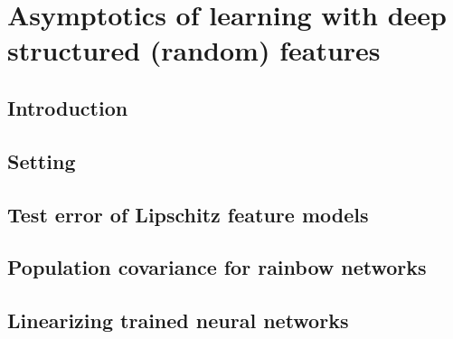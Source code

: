 \chapter[Deep random features]{Asymptotics of learning with deep structured (random) features}
\label{chap:deeprf}
\section{Introduction}

\section{Setting}

\section{Test error of Lipschitz feature models}

\section{Population covariance for rainbow networks}

\section{Linearizing trained neural networks}
